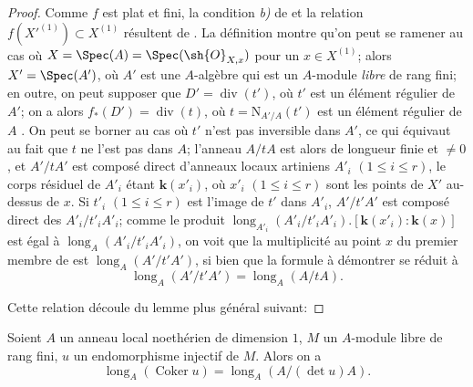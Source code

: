\begin{proof}
Comme $f$ est plat et fini, la condition \emph{b)} de  et la relation $f(X'^{(1)})\subset X^{(1)}$ résultent de .
La définition  montre qu'on peut se ramener au cas où $X=\Spec(A)=\Spec(\sh{O}_{X,x})$ pour un $x\in X^{(1)}$;
alors $X'=\Spec(A')$, où $A'$ est une
$A$-algèbre qui est un $A$-module \emph{libre} de rang fini;
en outre, on peut supposer que $D'=\operatorname{div}(t')$, où $t'$ est un élément régulier de $A'$;
on a alors $f_*(D')=\operatorname{div}(t)$, où $t=\mathrm{N}_{A'/A}(t')$ est un élément régulier de $A$ .
On peut se borner au cas où $t'$ n'est pas inversible dans $A'$, ce qui équivaut au fait que $t$ ne l'est pas dans $A$;
l'anneau $A/tA$ est alors de longueur finie et $\neq0$, et $A'/tA'$ est composé direct d'anneaux locaux artiniens $A'_i$ $(1\leq i\leq r)$, le corps résiduel de $A'_i$ étant $\boldsymbol{k}(x'_i)$, où $x'_i$ $(1\leq i\leq r)$ sont les points de $X'$ au-dessus de $x$.
Si $t'_i$ $(1\leq i\leq r)$ est l'image de $t'$ dans $A'_i$, $A'/t'A'$ est composé direct des $A'_i/t'_iA'_i$;
comme le produit $\operatorname{long}_{A'_i}(A'_i/t'_iA'_i).[\boldsymbol{k}(x'_i):\boldsymbol{k}(x)]$ est égal à $\operatorname{long}_A(A'_i/t'_iA'_i)$, on voit que la multiplicité au point $x$ du premier membre de  est $\operatorname{long}_A(A'/t'A')$, si bien que la formule à démontrer se réduit à
\[
\label{IV.21.10.17.2}
  \operatorname{long}_A(A'/t'A')=\operatorname{long}_A(A/tA).
  \tag{21.10.17.2}
\]

Cette relation découle du lemme plus général suivant:
\end{proof}

\begin{lemma}[21.10.17.3]
\label{IV.21.10.17.3}
Soient $A$ un anneau local noethérien de dimension $1$, $M$ un $A$-module libre de rang fini, $u$ un endomorphisme injectif de $M$.
Alors on a
\[
\label{IV.21.10.17.4}
  \operatorname{long}_A(\operatorname{Coker}u)=\operatorname{long}_A(A/(\det u)A).
  \tag{21.10.17.4}
\]
\end{lemma}

